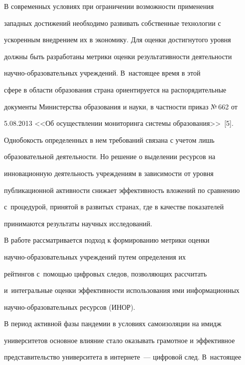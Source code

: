   


  В современных условиях при ограничении возможности применения 


западных достижений необходимо развивать собственные технологии с 


ускоренным внедрением их в экономику. Для оценки достигнутого уровня 


должны быть разработаны метрики оценки результативности деятельности  


на\-уч\-но-об\-ра\-зо\-ва\-тель\-ных учреждений. В~настоящее время в этой 


сфере в области образования страна ориентируется на распорядительные 


документы Министерства образования и науки, в частности приказ №\,662 от 


5.08.2013 <<Об осуществлении мониторинга системы образования>>~[5]. 


Однобокость определенных в нем требований связана с учетом лишь 


образовательной деятельности. Но решение о выделении ресурсов на 


инновационную деятельность учреждениям в зависимости от уровня 


публикационной активности снижает эффективность вложений по сравнению 


с~процедурой, принятой в развитых странах, где в качестве показателей 


принимаются результаты научных исследований.


  


  В работе рассматривается подход к формированию метрики оценки  


на\-уч\-но-об\-ра\-зо\-ва\-тель\-ных учреждений путем определения их 


рейтингов с~по\-мощью цифровых следов, позволяющих рассчитать 


и~интегральные оценки эффективности использования ими информационных  


на\-уч\-но-об\-ра\-зо\-ва\-тель\-ных ресурсов (ИНОР). 


  


  В период активной фазы пандемии в условиях самоизоляции на имидж 


университетов основное влияние стало оказывать грамотное и эффективное 


представительство университета в интернете~--- цифровой след. В~настоящее 


